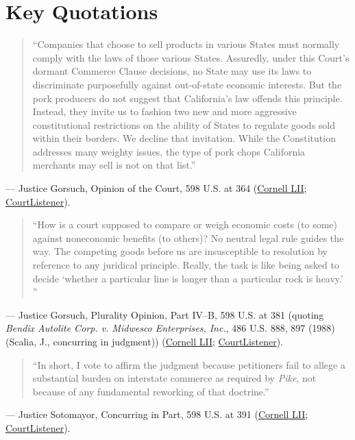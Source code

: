 \documentclass[12pt]{article}
\begin{document}
\section{Key Quotations}
\begin{quote}
``Companies that choose to sell products in various States must normally comply with the laws of those various States. Assuredly, under this Court's dormant Commerce Clause decisions, no State may use its laws to discriminate purposefully against out-of-state economic interests. But the pork producers do not suggest that California's law offends this principle. Instead, they invite us to fashion two new and more aggressive constitutional restrictions on the ability of States to regulate goods sold within their borders. We decline that invitation. While the Constitution addresses many weighty issues, the type of pork chops California merchants may sell is not on that list.''
\end{quote}
\noindent --- Justice Gorsuch, Opinion of the Court, 598 U.S. at 364 (\href{https://www.law.cornell.edu/supremecourt/text/21-468}{Cornell LII}; \href{https://www.courtlistener.com/opinion/10049695/national-pork-producers-council-v-ross/}{CourtListener}).

\begin{quote}
``How is a court supposed to compare or weigh economic costs (to some) against noneconomic benefits (to others)? No neutral legal rule guides the way. The competing goods before us are insusceptible to resolution by reference to any juridical principle. Really, the task is like being asked to decide `whether a particular line is longer than a particular rock is heavy.' ''
\end{quote}
\noindent --- Justice Gorsuch, Plurality Opinion, Part IV--B, 598 U.S. at 381 (quoting \textit{Bendix Autolite Corp. v. Midwesco Enterprises, Inc.}, 486 U.S. 888, 897 (1988) (Scalia, J., concurring in judgment)) (\href{https://www.law.cornell.edu/supremecourt/text/21-468}{Cornell LII}; \href{https://www.courtlistener.com/opinion/10049695/national-pork-producers-council-v-ross/}{CourtListener}).

\begin{quote}
``In short, I vote to affirm the judgment because petitioners fail to allege a substantial burden on interstate commerce as required by \textit{Pike}, not because of any fundamental reworking of that doctrine.''
\end{quote}
\noindent --- Justice Sotomayor, Concurring in Part, 598 U.S. at 391 (\href{https://www.law.cornell.edu/supremecourt/text/21-468}{Cornell LII}; \href{https://www.courtlistener.com/opinion/10049695/national-pork-producers-council-v-ross/}{CourtListener}).
\end{document}
